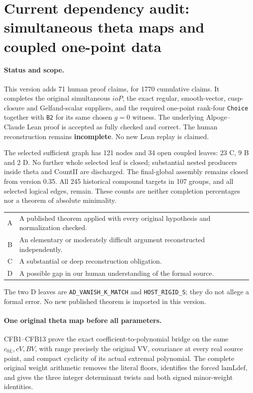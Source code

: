 \section{Current dependency audit: simultaneous theta maps and coupled one-point data}
\label{sec:dependency-audit-v36}

\paragraph{Status and scope.}
This version adds 71 human proof claims, for 1770 cumulative claims.
It completes the original simultaneous $ioP$, the exact regular,
smooth-vector, cusp-closure and Gelfand-scalar suppliers, and the
required one-point rank-four \texttt{Choice} together with
\texttt{B2} for its same chosen $g=0$ witness.
The underlying Alpoge--Claude Lean proof is accepted as fully checked
and correct. The human reconstruction remains \textbf{incomplete}.
No new Lean replay is claimed.

The selected sufficient graph has 121 nodes and 34 open coupled
leaves: 23 C, 9 B and 2 D. No further whole selected leaf is closed;
substantial nested producers inside theta and CountII are discharged.
The final-global assembly remains closed from version 0.35.
All 245 historical compound targets in 107 groups, and all selected
logical edges, remain. These counts are neither completion percentages
nor a theorem of absolute minimality.

\begin{center}\small
\begin{tabular}{cp{}}
A & A published theorem applied with every original hypothesis and normalization checked.\\
B & An elementary or moderately difficult argument reconstructed independently.\\
C & A substantial or deep reconstruction obligation.\\
D & A possible gap in our human understanding of the formal source.\\
\end{tabular}
\end{center}
The two D leaves are \texttt{AD\_VANISH\_K\_MATCH} and
\texttt{HOST\_RIGID\_S}; they do not allege a formal error.
No new published theorem is imported in this version.

\paragraph{One original theta map before all parameters.}
CFB1--CFB13 prove the exact coefficient-to-polynomial bridge on
the same $c_{0L},cV,BV$, with range precisely the original
$\mathrm{VV}$, covariance at every real source point, and compact
cyclicity of its actual extremal polynomial.
The complete original weight arithmetic removes the literal floors,
identifies the forced $\mathrm{lamLdef}$, and gives the three integer
determinant twists and both signed minor-weight identities.

